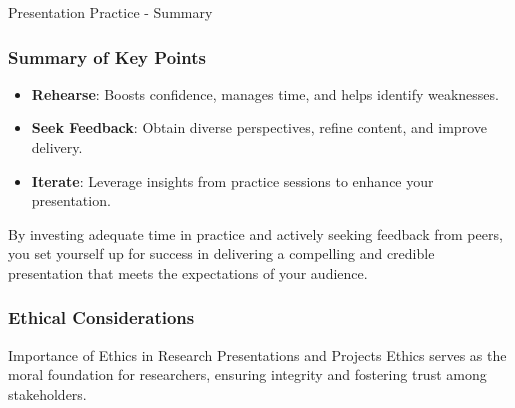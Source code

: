 \documentclass[aspectratio=169]{beamer}
\begin{document}
\begin{frame}[fragile]{Presentation Practice - Summary}
    \frametitle{Summary of Key Points}
    
    \begin{itemize}
        \item \textbf{Rehearse}: Boosts confidence, manages time, and helps identify weaknesses.
        \item \textbf{Seek Feedback}: Obtain diverse perspectives, refine content, and improve delivery.
        \item \textbf{Iterate}: Leverage insights from practice sessions to enhance your presentation.
    \end{itemize}

    By investing adequate time in practice and actively seeking feedback from peers, you set yourself up for success in delivering a compelling and credible presentation that meets the expectations of your audience.
\end{frame}

\begin{frame}[fragile]
    \frametitle{Ethical Considerations}
    \begin{block}{Importance of Ethics in Research Presentations and Projects}
        Ethics serves as the moral foundation for researchers, ensuring integrity and fostering trust among stakeholders.
    \end{block}
\end{frame}
\end{document}
